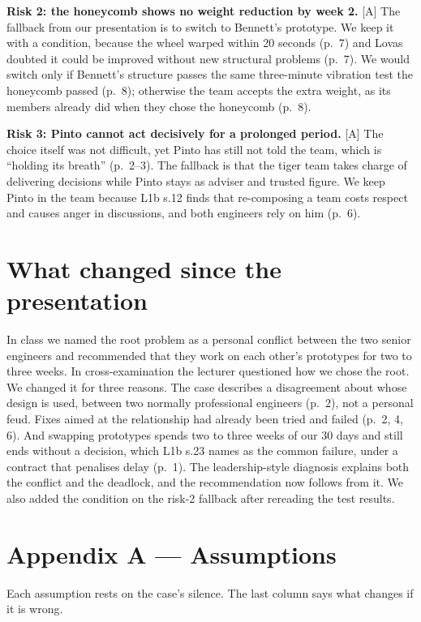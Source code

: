 \documentclass[oneside,final,11pt,letterpaper]{article}
\begin{document}
\textbf{Risk 2: the honeycomb shows no weight reduction by week 2.}
[A] The fallback from our presentation is to switch to Bennett's prototype. We keep it with a condition, because the wheel warped within 20 seconds (p.~7) and Lovas doubted it could be improved without new structural problems (p.~7). We would switch only if Bennett's structure passes the same three-minute vibration test the honeycomb passed (p.~8); otherwise the team accepts the extra weight, as its members already did when they chose the honeycomb (p.~8).

\textbf{Risk 3: Pinto cannot act decisively for a prolonged period.}
[A] The choice itself was not difficult, yet Pinto has still not told the team, which is ``holding its breath'' (p.~2--3). The fallback is that the tiger team takes charge of delivering decisions while Pinto stays as adviser and trusted figure. We keep Pinto in the team because L1b s.12 finds that re-composing a team costs respect and causes anger in discussions, and both engineers rely on him (p.~6).

\section[What changed]{What changed since the presentation}
In class we named the root problem as a personal conflict between the two senior engineers and recommended that they work on each other's prototypes for two to three weeks. In cross-examination the lecturer questioned how we chose the root. We changed it for three reasons. The case describes a disagreement about whose design is used, between two normally professional engineers (p.~2), not a personal feud. Fixes aimed at the relationship had already been tried and failed (p.~2, 4, 6). And swapping prototypes spends two to three weeks of our 30 days and still ends without a decision, which L1b s.23 names as the common failure, under a contract that penalises delay (p.~1). The leadership-style diagnosis explains both the conflict and the deadlock, and the recommendation now follows from it. We also added the condition on the risk-2 fallback after rereading the test results.

\nocite{msd2026c1,goleman2000,herzberg1968,soomro2016,thompson2015,hoffmann2021,verwijs2024,hoover2010,rebori1998}
\clearpage
\printbibliography

\clearpage
\section*{Appendix A --- Assumptions}
Each assumption rests on the case's silence. The last column says what changes if it is wrong.
\end{document}
